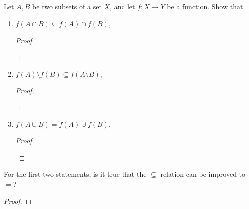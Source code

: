 \documentclass[../../main.tex]{subfiles}
\begin{document}
\subsection{}
\begin{q}
    Let $A, B$ be two subsets of a set $X$, and let $f \colon X \to Y$ be a function. Show that
    \begin{enumerate}
        \item $f(A \cap B) \subseteq f(A) \cap f(B)$,
        \begin{proof}

            \begin{xx}
                
            \end{xx}
        \end{proof}        
        \item $f(A) \setminus f(B) \subseteq f(A \setminus B)$,
        \begin{proof}

            \begin{xx}
                
            \end{xx}
        \end{proof}
        
        \item $f(A \cup B) = f(A) \cup f(B)$.
        \begin{proof}

            \begin{xx}
                
            \end{xx}
        \end{proof}
        
    \end{enumerate}
    For the first two statements, is it true that the $\subseteq$ relation can be improved to $=$?

    \begin{ans}
    
    \end{ans}
    \begin{proof}
        
    \end{proof}
\end{q}

\addtocounter{subsection}{1}
\end{document}
